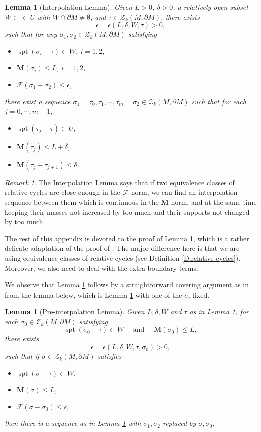 \documentclass[10pt]{amsart}
\newtheorem{lemma}[theorem]{Lemma}
\theoremstyle{definition}
\theoremstyle{remark}
\newtheorem{remark}[theorem]{Remark}
\numberwithin{equation}{section}
\newcommand{\F}{\mathcal{F}}
\newcommand{\si}{\sigma}
\newcommand{\de}{\delta}
\newcommand{\ep}{\epsilon}
\newcommand{\Z}{\mathcal{Z}}
\newcommand{\M}{\mathbf{M}}
\newcommand{\spt}{\operatorname{spt}}
\begin{document}
\begin{lemma}[Interpolation Lemma]
\label{L:interpolation}
Given $L>0$, $\de>0$, a relatively open subset $W\subset \subset U$ with $W \cap \partial M\neq \emptyset$, and $\tau\in\Z_k(M, \partial M)$, there exists 
\[ \ep=\ep(L, \de, W, \tau)>0,\]
such that for any $\si_1, \si_2\in \Z_k(M, \partial M)$ satisfying
\begin{itemize}
\item $\spt(\si_i-\tau)\subset W$, $i=1, 2$,
\item $\M(\si_i)\leq L$, $i=1, 2$,
\item $\F(\si_1-\si_2)\leq \ep$,
\end{itemize}
there exist a sequence $\si_1=\tau_0, \tau_1, \cdots, \tau_m=\si_2\in \Z_k(M, \partial M)$ such that for each $j=0, \cdots, m-1$,
\begin{itemize}
\item[(i)] $\spt(\tau_j-\tau)\subset U$,
\item[(ii)] $\M(\tau_j)\leq L+\de$,
\item[(iii)] $\M(\tau_j-\tau_{j+1})\leq \de$.
\end{itemize}
\end{lemma}

\begin{remark}
The Interpolation Lemma says that if two equivalence classes of relative cycles are close enough in the $\F$-norm, we can find an interpolation sequence between them which is continuous in the $\M$-norm, and at the same time keeping their masses not increased by too much and their supports not changed by too much.
\end{remark}

The rest of this appendix is devoted to the proof of Lemma \ref{L:interpolation}, which is a rather delicate adaptation of the proof of \cite[Lemma 3.7, Lemma 3.8]{Pitts}. The major difference here is that we are using equivalence classes of relative cycles (see Definition \ref{D:relative-cycles}). Moreover, we also need to deal with the extra boundary terms. 

We observe that Lemma \ref{L:interpolation} follows by a straightforward covering argument as in \cite[page 124]{Pitts} from the lemma below, which is Lemma \ref{L:interpolation} with one of the $\si_i$ fixed.


\begin{lemma}[Pre-interpolation Lemma]
\label{L:pre-interpolation-lemma}
Given $L,\de, W$ and $\tau$ as in Lemma \ref{L:interpolation}, for each $\si_0\in\Z_k(M, \partial M)$ satisfying
\[ \spt(\si_0-\tau) \subset W \quad \text{ and } \quad \M (\si_0)\leq L,\]
there exists 
\[ \ep=\ep(L, \de, W, \tau, \si_0)>0,\]
such that if $\si\in \Z_k(M, \partial M)$ satisfies
\begin{itemize}
\item $\spt(\si-\tau) \subset W,$ 
\item $\M(\si)\leq L$,
\item $\F(\si-\si_0)\leq \ep,$
\end{itemize}
then there is a sequence as in Lemma \ref{L:interpolation} with $\si_1, \si_2$ replaced by $\si, \si_0$.
\end{lemma}
\end{document}
